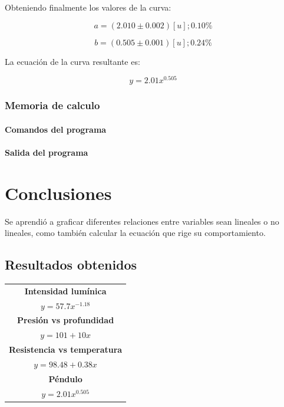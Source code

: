 \documentclass[letter,11pt]{article}
\begin{document}
Obteniendo finalmente los valores de la curva:

\begin{equation}
    a = (2.010 \pm 0.002)[u];0.10\%
\end{equation}

\begin{equation}
    b = (0.505 \pm 0.001)[u];0.24\%
\end{equation}

La ecuación de la curva resultante es:

\begin{equation}
    y = 2.01 x^{0.505}
\end{equation}

\subsubsection{Memoria de calculo}

\paragraph{Comandos del programa}
\begin{alltt}
\footnotesize

\normalsize
\end{alltt}

\paragraph{Salida del programa}
\begin{alltt}
\footnotesize

\normalsize
\end{alltt}

\section{Conclusiones}
Se aprendió a graficar diferentes relaciones entre variables sean lineales o
no lineales, como también calcular la ecuación que rige su comportamiento.

\subsection{Resultados obtenidos}

\begin{center}
\begin{tabular}{|c|c|}
\hline
\multicolumn{2}{|c|}{\textbf{Intensidad lumínica}} \\
\multicolumn{2}{|c|}{$y = 57.7 x^{-1.18}$} \\
\hline
\multicolumn{2}{|c|}{\textbf{Presión vs profundidad}} \\
\multicolumn{2}{|c|}{$y = 101 + 10 x$} \\
\hline
\multicolumn{2}{|c|}{\textbf{Resistencia vs temperatura}} \\
\multicolumn{2}{|c|}{$y = 98.48 + 0.38 x$} \\
\hline
\multicolumn{2}{|c|}{\textbf{Péndulo}} \\
\multicolumn{2}{|c|}{$y = 2.01 x^{0.505}$} \\
\hline
\end{tabular}
\end{center}
\end{document}
